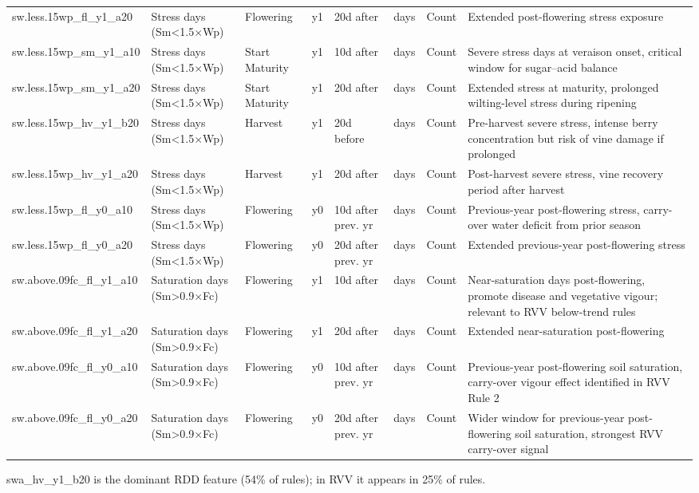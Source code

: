 {\begin{longtable}{p{2.2cm}|p{1.5cm}|p{1.2cm}|p{0.4cm}|p{1.4cm}|p{0.7cm}|p{0.9cm}|p{4.8cm}}
sw.less.15wp\_fl\_y1\_a20 & Stress days (Sm<1.5$\times$Wp) & Flowering & y1 & 20d after & days & Count & Extended post-flowering stress exposure \\
sw.less.15wp\_sm\_y1\_a10 & Stress days (Sm<1.5$\times$Wp) & Start Maturity & y1 & 10d after & days & Count & Severe stress days at veraison onset, critical window for sugar--acid balance \\
sw.less.15wp\_sm\_y1\_a20 & Stress days (Sm<1.5$\times$Wp) & Start Maturity & y1 & 20d after & days & Count & Extended stress at maturity, prolonged wilting-level stress during ripening \\
sw.less.15wp\_hv\_y1\_b20 & Stress days (Sm<1.5$\times$Wp) & Harvest & y1 & 20d before & days & Count & Pre-harvest severe stress, intense berry concentration but risk of vine damage if prolonged \\
sw.less.15wp\_hv\_y1\_a20 & Stress days (Sm<1.5$\times$Wp) & Harvest & y1 & 20d after & days & Count & Post-harvest severe stress, vine recovery period after harvest \\
sw.less.15wp\_fl\_y0\_a10 & Stress days (Sm<1.5$\times$Wp) & Flowering & y0 & 10d after prev. yr & days & Count & Previous-year post-flowering stress, carry-over water deficit from prior season \\
sw.less.15wp\_fl\_y0\_a20 & Stress days (Sm<1.5$\times$Wp) & Flowering & y0 & 20d after prev. yr & days & Count & Extended previous-year post-flowering stress \\
sw.above.09fc\_fl\_y1\_a10 & Saturation days (Sm>0.9$\times$Fc) & Flowering & y1 & 10d after & days & Count & Near-saturation days post-flowering, promote disease and vegetative vigour; relevant to RVV below-trend rules \\
sw.above.09fc\_fl\_y1\_a20 & Saturation days (Sm>0.9$\times$Fc) & Flowering & y1 & 20d after & days & Count & Extended near-saturation post-flowering \\
sw.above.09fc\_fl\_y0\_a10 & Saturation days (Sm>0.9$\times$Fc) & Flowering & y0 & 10d after prev. yr & days & Count & Previous-year post-flowering soil saturation, carry-over vigour effect identified in RVV Rule 2 \\
sw.above.09fc\_fl\_y0\_a20 & Saturation days (Sm>0.9$\times$Fc) & Flowering & y0 & 20d after prev. yr & days & Count & Wider window for previous-year post-flowering soil saturation, strongest RVV carry-over signal \\
\end{longtable}
}

swa\_hv\_y1\_b20 is the dominant RDD feature (54\% of rules); in RVV it appears in 25\% of rules.
